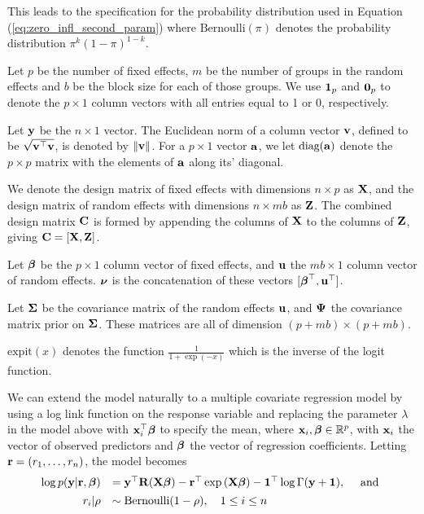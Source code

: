 \noindent This leads to the specification for the probability distribution used
in Equation (\ref{eq:zero_infl_second_param}) where $\text{Bernoulli}(\pi)$
denotes the probability distribution $\pi^k (1 - \pi)^{1-k}$.

Let $p$ be the number of fixed effects, $m$ be the number of groups in the
random effects and $b$ be the block size for each of those groups. We use
${\bf 1}_p$ and ${\bf 0}_p$ to denote the $p \times 1$ column vectors with all
entries equal to 1 or 0, respectively.

Let ${\bf y}$ be the $n \times 1$ vector. The Euclidean norm of a column vector
${\bf v}$, defined to be $\sqrt{{\bf v}^\top {\bf v}}$, is  denoted by $\|{\bf v}\|$. For a $p
\times 1$ vector ${\bf a}$, we let $\text{diag}{({\bf a})}$ denote the $p \times p$ matrix
with the elements of ${\bf a}$ along its' diagonal.

We denote the design matrix of fixed effects with dimensions $n \times p$ as
${\bf X}$, and the design matrix of random  effects with dimensions $n \times m b$
as ${\bf Z}$. The combined design matrix ${\bf C}$ is formed by appending the columns
of ${\bf X}$ to the columns of ${\bf Z}$, giving ${\bf C} = [ {\bf X}, {\bf Z} ]$.

Let ${\boldsymbol \beta}$ be the $p \times 1$ column vector of fixed effects, and ${\bf u}$ the
$m b \times 1$ column vector of random effects. ${\boldsymbol \nu}$ is the concatenation of
these vectors $[{\boldsymbol \beta}^\top, {\bf u}^\top]$.

Let ${\boldsymbol \Sigma}$ be the covariance matrix of the random effects ${\bf u}$, and ${\boldsymbol \Psi}$
the covariance matrix prior on ${\boldsymbol \Sigma}$.  These matrices are all of dimension
$(p + m b) \times (p + m b)$.

$\text{expit}(x)$ denotes the function $\tfrac{1}{1 + \exp(-x)}$ which is the
inverse of the logit function.

We can extend the model naturally to a multiple covariate regression model by
using a log link function on the response variable and replacing the parameter
$\lambda$ in the model above with ${\bf x}_i^\top {\boldsymbol\beta}$ to specify the mean,
where ${\bf x}_i,{\boldsymbol \beta} \in {\mathbb{R}}^p$, with ${\bf x}_i$ the vector of observed predictors
and ${\boldsymbol \beta}$ the vector of regression coefficients. Letting ${\bf r} =
(r_1,\ldots,r_n)$, the model becomes
\begin{equation*}%
	\begin{array}{rl}
		\log p(\vy|\vr, \vbeta) 
		    & = \vy^\top \mR (\mX\vbeta)                           
		- \vr^\top \exp{(\mX\vbeta)} 
		- \vone^\top \log{\Gamma{(\vy + \vone)}}, \quad \mbox{ and }\\ [1ex]
		r_i | \rho & \sim \text{Bernoulli}(1-\rho), \quad 1 \leq i \leq n \\
	\end{array}
\end{equation*}

